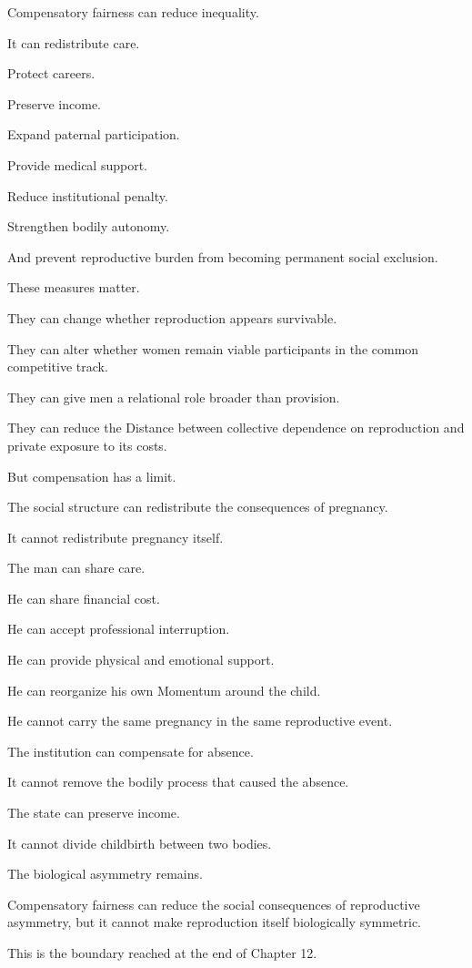 Compensatory fairness can reduce inequality.

It can redistribute care.

Protect careers.

Preserve income.

Expand paternal participation.

Provide medical support.

Reduce institutional penalty.

Strengthen bodily autonomy.

And prevent reproductive burden from becoming permanent social exclusion.

These measures matter.

They can change whether reproduction appears survivable.

They can alter whether women remain viable participants in the common competitive track.

They can give men a relational role broader than provision.

They can reduce the Distance between collective dependence on reproduction and private exposure to its costs.

But compensation has a limit.

The social structure can redistribute the consequences of pregnancy.

It cannot redistribute pregnancy itself.

The man can share care.

He can share financial cost.

He can accept professional interruption.

He can provide physical and emotional support.

He can reorganize his own Momentum around the child.

He cannot carry the same pregnancy in the same reproductive event.

The institution can compensate for absence.

It cannot remove the bodily process that caused the absence.

The state can preserve income.

It cannot divide childbirth between two bodies.

The biological asymmetry remains.

Compensatory fairness can reduce the social consequences of reproductive asymmetry, but it cannot make reproduction itself biologically symmetric.

This is the boundary reached at the end of Chapter 12.

